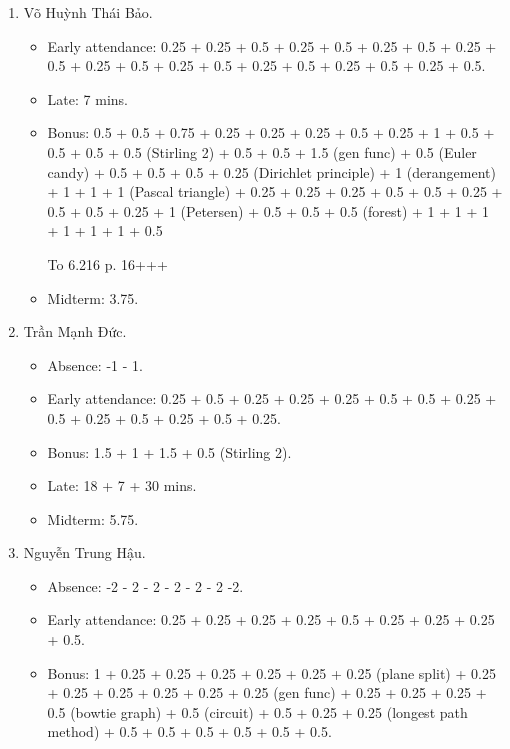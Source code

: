 \documentclass{article}
\begin{document}
\begin{enumerate}
\begin{itemize}
		\item Bonus: 1.5 + 1 + 0.5 + 1.5 + 1 (Stirling 2) + 0.25 + 0.25 + 0.5 (Euler) + 0.25 (monic monomial) + 0.5 + 0.25 + 1 (types of graph) + 0.5 + 1 (recursion sum of powers) + 0.5 + 0.25 + 0.25 + 0.75 (graphic) + 0.5 + 0.25 + 0.25 + 0.75 + 0.5 + 0.75. Done.
        \item Midterm: 6.5.
	\end{itemize}
	\item {\sc Võ Huỳnh Thái Bảo.}
	\begin{itemize}
		\item Early attendance: 0.25 + 0.25 + 0.5 + 0.25 + 0.5 + 0.25 + 0.5 + 0.25 + 0.5 + 0.25 + 0.5 + 0.25 + 0.5 + 0.25 + 0.5 + 0.25 + 0.5 + 0.25 + 0.5.
		\item Late: 7 mins.
		\item Bonus: 0.5 + 0.5 + 0.75 + 0.25 + 0.25 + 0.25 + 0.5 + 0.25 + 1 + 0.5 + 0.5 + 0.5 + 0.5 (Stirling 2) + 0.5 + 0.5 + 1.5 (gen func) + 0.5 (Euler candy) + 0.5 + 0.5 + 0.5 + 0.25 (Dirichlet principle) + 1 (derangement) + 1 + 1 + 1 (Pascal triangle) + 0.25 + 0.25 + 0.25 + 0.5 + 0.5 + 0.25 + 0.5 + 0.5 + 0.25 + 1 (Petersen) + 0.5 + 0.5 + 0.5 (forest) + 1 + 1 + 1 + 1 + 1 + 1 + 0.5

        To 6.216 p. 16+++
        \item Midterm: 3.75.
	\end{itemize}
	\item {\sc Trần Mạnh Đức.}
	\begin{itemize}
		\item Absence: -1 - 1.
		\item Early attendance: 0.25 + 0.5 + 0.25 + 0.25 + 0.25 + 0.5 + 0.5 + 0.25 + 0.5 + 0.25 + 0.5 + 0.25 + 0.5 + 0.25.
		\item Bonus: 1.5 + 1 + 1.5 + 0.5 (Stirling 2).
		\item Late: 18 + 7 + 30 mins.
        \item Midterm: 5.75.
	\end{itemize}
	\item {\sc Nguyễn Trung Hậu.}
	\begin{itemize}
		\item Absence: -2 - 2 - 2 - 2 - 2 - 2 -2.
		\item Early attendance: 0.25 + 0.25 + 0.25 + 0.25 + 0.5 + 0.25 + 0.25 + 0.25 + 0.5.
		\item Bonus: 1 + 0.25 + 0.25 + 0.25 + 0.25 + 0.25 + 0.25 (plane split) + 0.25 + 0.25 + 0.25 + 0.25 + 0.25 + 0.25 (gen func) + 0.25 + 0.25 + 0.25 + 0.5 (bowtie graph) + 0.5 (circuit) + 0.5 + 0.25 + 0.25 (longest path method) + 0.5 + 0.5 + 0.5 + 0.5 + 0.5 + 0.5.


\end{itemize}
\end{enumerate}
\end{document}
